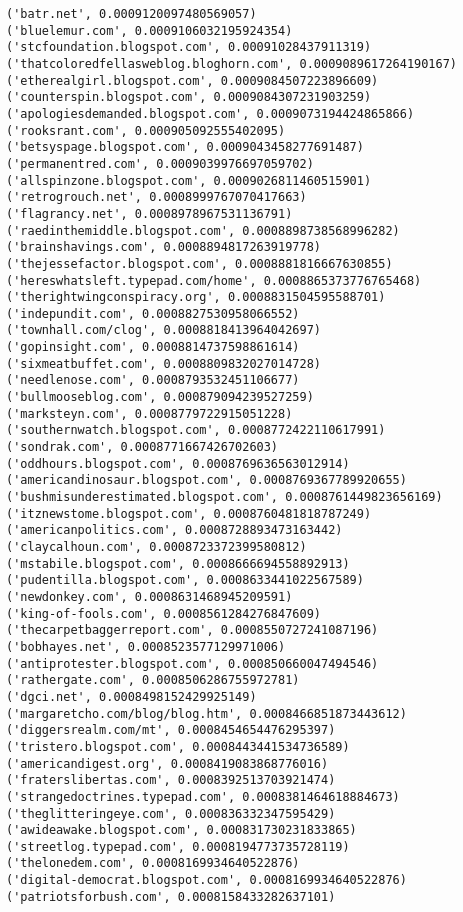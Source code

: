 \documentclass[11pt]{article}
\begin{document}
\begin{Verbatim}[commandchars=\\\{\}]
('batr.net', 0.0009120097480569057)
('bluelemur.com', 0.0009106032195924354)
('stcfoundation.blogspot.com', 0.00091028437911319)
('thatcoloredfellasweblog.bloghorn.com', 0.0009089617264190167)
('etherealgirl.blogspot.com', 0.0009084507223896609)
('counterspin.blogspot.com', 0.0009084307231903259)
('apologiesdemanded.blogspot.com', 0.0009073194424865866)
('rooksrant.com', 0.000905092555402095)
('betsyspage.blogspot.com', 0.0009043458277691487)
('permanentred.com', 0.0009039976697059702)
('allspinzone.blogspot.com', 0.0009026811460515901)
('retrogrouch.net', 0.0008999767070417663)
('flagrancy.net', 0.0008978967531136791)
('raedinthemiddle.blogspot.com', 0.0008898738568996282)
('brainshavings.com', 0.0008894817263919778)
('thejessefactor.blogspot.com', 0.0008881816667630855)
('hereswhatsleft.typepad.com/home', 0.0008865373776765468)
('therightwingconspiracy.org', 0.0008831504595588701)
('indepundit.com', 0.0008827530958066552)
('townhall.com/clog', 0.0008818413964042697)
('gopinsight.com', 0.0008814737598861614)
('sixmeatbuffet.com', 0.0008809832027014728)
('needlenose.com', 0.0008793532451106677)
('bullmooseblog.com', 0.000879094239527259)
('marksteyn.com', 0.0008779722915051228)
('southernwatch.blogspot.com', 0.0008772422110617991)
('sondrak.com', 0.0008771667426702603)
('oddhours.blogspot.com', 0.0008769636563012914)
('americandinosaur.blogspot.com', 0.0008769367789920655)
('bushmisunderestimated.blogspot.com', 0.0008761449823656169)
('itznewstome.blogspot.com', 0.0008760481818787249)
('americanpolitics.com', 0.0008728893473163442)
('claycalhoun.com', 0.0008723372399580812)
('mstabile.blogspot.com', 0.0008666694558892913)
('pudentilla.blogspot.com', 0.0008633441022567589)
('newdonkey.com', 0.0008631468945209591)
('king-of-fools.com', 0.0008561284276847609)
('thecarpetbaggerreport.com', 0.0008550727241087196)
('bobhayes.net', 0.0008523577129971006)
('antiprotester.blogspot.com', 0.000850660047494546)
('rathergate.com', 0.0008506286755972781)
('dgci.net', 0.0008498152429925149)
('margaretcho.com/blog/blog.htm', 0.0008466851873443612)
('diggersrealm.com/mt', 0.0008454654476295397)
('tristero.blogspot.com', 0.0008443441534736589)
('americandigest.org', 0.0008419083868776016)
('fraterslibertas.com', 0.0008392513703921474)
('strangedoctrines.typepad.com', 0.0008381464618884673)
('theglitteringeye.com', 0.000836332347595429)
('awideawake.blogspot.com', 0.000831730231833865)
('streetlog.typepad.com', 0.0008194773735728119)
('thelonedem.com', 0.0008169934640522876)
('digital-democrat.blogspot.com', 0.0008169934640522876)
('patriotsforbush.com', 0.0008158433282637101)

\end{Verbatim}
\end{document}
